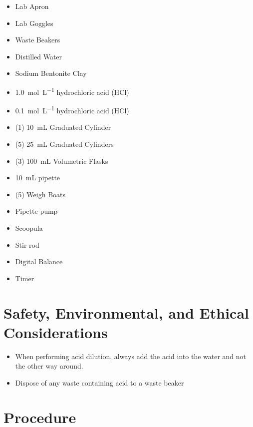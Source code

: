 \documentclass[11pt, letterpaper]{article}
\begin{document}
\begin{itemize}
    \item Lab Apron
    \item Lab Goggles
    \item Waste Beakers
    \item Distilled Water
    \item Sodium Bentonite Clay
    \item \SI{1.0}{mol.L^{-1}} hydrochloric acid (HCl)
    \item \SI{0.1}{mol.L^{-1}} hydrochloric acid (HCl)
    \item (1) \SI{10}{mL} Graduated Cylinder
    \item (5) \SI{25}{mL} Graduated Cylinders
    \item (3) \SI{100}{mL} Volumetric Flasks
    \item \SI{10}{mL} pipette
    \item (5) Weigh Boats
    \item Pipette pump
    \item Scoopula
    \item Stir rod
    \item Digital Balance
    \item Timer
\end{itemize}

\section{Safety, Environmental, and Ethical Considerations}

\begin{itemize}
    \item When performing acid dilution, always add the acid into the water and not the other way around.
    \item Dispose of any waste containing acid to a waste beaker
\end{itemize}

\section{Procedure}
\end{document}
